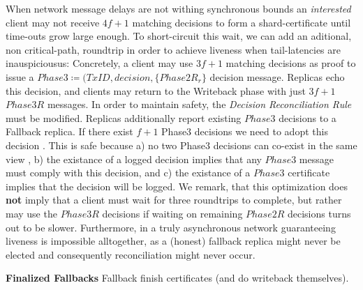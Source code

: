 When network message delays are not withing synchronous bounds an \textit{interested} client may not receive $4f+1$ matching decisions to form a shard-certificate until time-outs grow large enough. To short-circuit this wait, we can add an aditional, non critical-path, roundtrip in order to achieve liveness when tail-latencies are inauspiciousus: 
Concretely, a client may use $3f+1$ matching decisions as proof to issue a $Phase3 \coloneqq (TxID, decision, \{Phase2R_r\}$ decision message. Replicas echo this decision, and clients may return to the Writeback phase with just $3f+1$ $Phase3R$ messages. In order to maintain safety, the \textit{Decision Reconciliation Rule} must be modified. Replicas additionally report existing $Phase3$ decisions to a Fallback replica. If there exist $f+1$ Phase3 decisions we need to adopt this decision . This is safe because a) no two Phase3 decisions can co-exist in the same view , b) the existance of a logged decision implies that any $Phase3$ message must comply with this decision, and c) the existance of a $Phase3$ certificate implies that the decision will be logged. 
We remark, that this optimization does \textbf{not} imply that a client must wait for three roundtrips to complete, but rather may use the $Phase3R$ decisions if waiting on remaining $Phase2R$ decisions turns out to be slower. Furthermore, in a truly asynchronous network guaranteeing liveness is impossible alltogether, as a (honest) fallback replica might never be elected and consequently reconciliation might never occur.

\iffalse
\textbf{Finalized Fallbacks}
Fallback finish certificates (and do writeback themselves).\\





